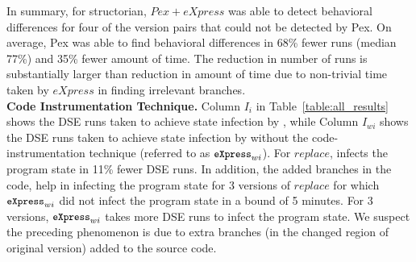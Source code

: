   In summary, for structorian, $Pex+eXpress$ was able to detect behavioral differences for four of the version pairs that could not be detected by Pex. On average, Pex was able to find behavioral differences in 68\% fewer runs (median 77\%) and 35\% fewer amount of time. 
  The reduction in number of runs is substantially larger than reduction in amount of time due to non-trivial time taken by 
  $eXpress$ in finding irrelevant branches.
\\ \textbf{Code Instrumentation  Technique.} Column $I_i$ in Table~\ref{table:all_results} shows the DSE runs taken 
to achieve
state infection by , while Column $I_{wi}$ shows the DSE runs taken to achieve
state infection by  without the
code-instrumentation technique (referred to as $\CodeIn{eXpress}_{wi}$). 
For $replace$,  infects the program state in 11\% fewer DSE runs. 
In addition, the added branches in the code,
help in infecting the program state for 3 versions of $replace$ for which $\CodeIn{eXpress}_{wi}$ did not infect the 
program state in a bound of 5 minutes. For 3 versions, $\CodeIn{eXpress}_{wi}$ 
takes more DSE runs to infect the program state. We suspect the preceding phenomenon
is due to extra branches (in the changed region of original version) added to the source code.

